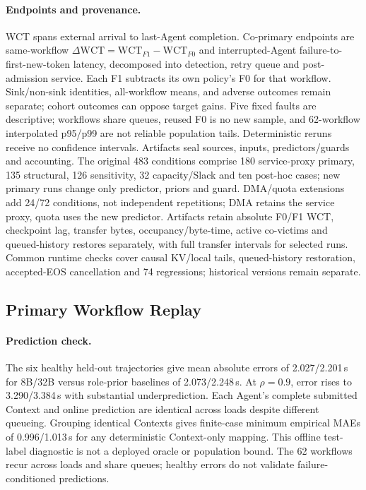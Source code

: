 \paragraph{Endpoints and provenance.}
WCT spans external arrival to last-Agent completion. Co-primary endpoints
are same-workflow $\Delta\mathrm{WCT}=\mathrm{WCT}_{F1}-\mathrm{WCT}_{F0}$
and interrupted-Agent failure-to-first-new-token latency, decomposed into
detection, retry queue and post-admission service. Each F1 subtracts its own
policy's F0 for that workflow. Sink/non-sink identities, all-workflow means,
and adverse outcomes remain separate; cohort outcomes can oppose target gains.
Five fixed faults
are descriptive; workflows share queues, reused F0 is no new sample, and
62-workflow interpolated p95/p99 are not reliable population tails.
Deterministic reruns receive no confidence intervals.
Artifacts seal sources, inputs, predictors/guards and accounting. The original
483 conditions comprise 180 service-proxy primary, 135 structural, 126 sensitivity,
32 capacity/Slack and ten post-hoc cases; new primary runs change only predictor,
priors and guard. DMA/quota extensions add 24/72 conditions, not independent
repetitions; DMA retains the service proxy, quota uses the new predictor.
Artifacts retain absolute F0/F1 WCT, checkpoint lag, transfer bytes,
occupancy/byte-time, active co-victims and queued-history restores separately,
with full transfer intervals for selected runs.
Common runtime checks cover causal KV/local tails, queued-history
restoration, accepted-EOS cancellation and 74 regressions; historical versions
remain separate.

\subsection{Primary Workflow Replay}
\label{sec:eval-primary}
\paragraph{Prediction check.}
The six healthy held-out trajectories give mean absolute errors of
2.027/2.201\,s for 8B/32B versus role-prior baselines of 2.073/2.248\,s.
At $\rho=0.9$, error rises to 3.290/3.384\,s with substantial underprediction.
Each Agent's complete submitted Context and online prediction are identical
across loads despite different queueing. Grouping identical Contexts gives
finite-case minimum empirical MAEs of 0.996/1.013\,s for any deterministic
Context-only mapping. This offline test-label diagnostic is not a deployed
oracle or population bound. The 62 workflows recur across loads and share
queues; healthy errors do not validate failure-conditioned predictions.

